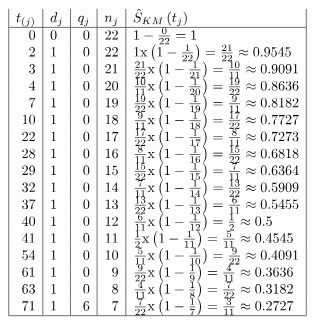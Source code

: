 \documentclass[
  12pt,
  letterpaper,
]{article}
\begin{document}
\[
\begin{array}{|r|l|r|r|l|}
t_{(j)} & d_j & q_j & n_j & \hat{S}_{K M}\left(t_j\right) \\
\hline 0 & 0 & 0 & 22 & 1-\frac{0}{22}=1 \\
2 & 1 & 0 & 22 & 1 \mathrm{x}\left(1-\frac{1}{22}\right)=\frac{21}{22} \approx 0.9545 \\
3 & 1 & 0 & 21 & \frac{21}{22} \mathrm{x}\left(1-\frac{1}{21}\right)=\frac{10}{11} \approx 0.9091 \\
4 & 1 & 0 & 20 & \frac{10}{11} \mathrm{x}\left(1-\frac{1}{20}\right)=\frac{19}{22} \approx 0.8636 \\
7 & 1 & 0 & 19 & \frac{19}{22} \mathrm{x}\left(1-\frac{1}{19}\right)=\frac{9}{11} \approx 0.8182 \\
10 & 1 & 0 & 18 & \frac{9}{11} \mathrm{x}\left(1-\frac{1}{18}\right)=\frac{17}{22} \approx 0.7727 \\
22 & 1 & 0 & 17 & \frac{17}{22} \mathrm{x}\left(1-\frac{1}{17}\right)=\frac{8}{11} \approx 0.7273 \\
28 & 1 & 0 & 16 & \frac{8}{11} \mathrm{x}\left(1-\frac{1}{16}\right)=\frac{15}{22} \approx 0.6818 \\
29 & 1 & 0 & 15 & \frac{15}{22} \mathrm{x}\left(1-\frac{1}{15}\right)=\frac{7}{11} \approx 0.6364 \\
32 & 1 & 0 & 14 & \frac{7}{11} \mathrm{x}\left(1-\frac{1}{14}\right)=\frac{13}{22} \approx 0.5909 \\
37 & 1 & 0 & 13 & \frac{13}{22} \mathrm{x}\left(1-\frac{1}{13}\right)=\frac{6}{11} \approx 0.5455 \\
40 & 1 & 0 & 12 & \frac{6}{11} \mathrm{x}\left(1-\frac{1}{12}\right)=\frac{1}{2} \approx 0.5 \\
41 & 1 & 0 & 11 & \frac{1}{2} \mathrm{x}\left(1-\frac{1}{11}\right)=\frac{5}{11} \approx 0.4545 \\
54 & 1 & 0 & 10 & \frac{5}{11} \mathrm{x}\left(1-\frac{1}{10}\right)=\frac{9}{22} \approx 0.4091 \\
61 & 1 & 0 & 9 & \frac{9}{22} \mathrm{x}\left(1-\frac{1}{9}\right)=\frac{4}{11} \approx 0.3636 \\
63 & 1 & 0 & 8 & \frac{4}{11} \mathrm{x}\left(1-\frac{1}{8}\right)=\frac{7}{22} \approx 0.3182 \\
71 & 1 & 6 & 7 & \frac{7}{22} \mathrm{x}\left(1-\frac{1}{7}\right)=\frac{3}{11} \approx 0.2727 \\
\hline
\end{array}
\]
\end{document}
